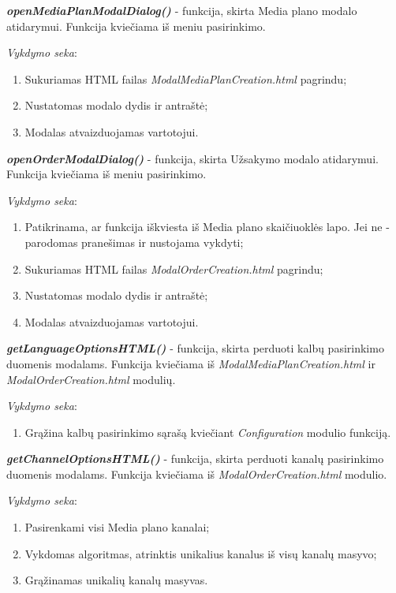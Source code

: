 \textit{\textbf{openMediaPlanModalDialog()}} - funkcija, skirta Media plano modalo atidarymui. Funkcija kviečiama iš meniu pasirinkimo.

\bigskip
\textit{Vykdymo seka}:
\begin{enumerate}
    \itemsep0em 
    \item Sukuriamas HTML failas \textit{ModalMediaPlanCreation.html} pagrindu;
    \item Nustatomas modalo dydis ir antraštė;
    \item Modalas atvaizduojamas vartotojui.
\end{enumerate}

\bigskip
\textit{\textbf{openOrderModalDialog()}} - funkcija, skirta Užsakymo modalo atidarymui. Funkcija kviečiama iš meniu pasirinkimo.

\bigskip
\textit{Vykdymo seka}:
\begin{enumerate}
    \itemsep0em 
    \item Patikrinama, ar funkcija iškviesta iš Media plano skaičiuoklės lapo. Jei ne - parodomas pranešimas ir nustojama vykdyti;
    \item Sukuriamas HTML failas \textit{ModalOrderCreation.html} pagrindu;
    \item Nustatomas modalo dydis ir antraštė;
    \item Modalas atvaizduojamas vartotojui.
\end{enumerate}

\bigskip
\textit{\textbf{getLanguageOptionsHTML()}} - funkcija, skirta perduoti kalbų pasirinkimo duomenis modalams. 
Funkcija kviečiama iš \textit{ModalMediaPlanCreation.html} ir \textit{ModalOrderCreation.html} modulių.

\bigskip
\textit{Vykdymo seka}:
\begin{enumerate}
    \itemsep0em 
    \item Grąžina kalbų pasirinkimo sąrašą kviečiant \textit{Configuration} modulio funkciją.
\end{enumerate}

\bigskip
\textit{\textbf{getChannelOptionsHTML()}} - funkcija, skirta perduoti kanalų pasirinkimo duomenis modalams. 
Funkcija kviečiama iš \textit{ModalOrderCreation.html} modulio.

\bigskip
\textit{Vykdymo seka}:
\begin{enumerate}
    \itemsep0em 
    \item Pasirenkami visi Media plano kanalai;
    \item Vykdomas algoritmas, atrinktis unikalius kanalus iš visų kanalų masyvo;
    \item Grąžinamas unikalių kanalų masyvas.
\end{enumerate}

